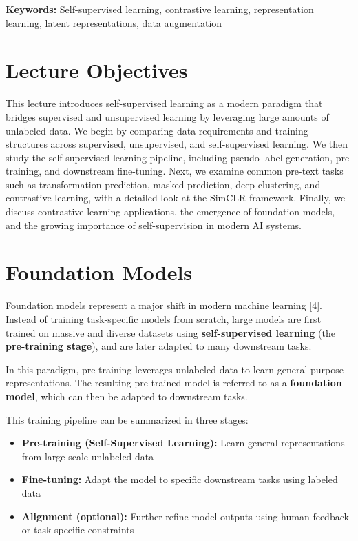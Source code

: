 \documentclass{article}
\renewcommand{\cite}[1]{[#1]}
\begin{document}
\noindent\textbf{Keywords:} Self-supervised learning, contrastive learning, representation learning, latent representations, data augmentation

\section{Lecture Objectives}

This lecture introduces self-supervised learning as a modern paradigm that bridges supervised and unsupervised learning by leveraging large amounts of unlabeled data. We begin by comparing data requirements and training structures across supervised, unsupervised, and self-supervised learning. We then study the self-supervised learning pipeline, including pseudo-label generation, pre-training, and downstream fine-tuning. Next, we examine common pre-text tasks such as transformation prediction, masked prediction, deep clustering, and contrastive learning, with a detailed look at the SimCLR framework. Finally, we discuss contrastive learning applications, the emergence of foundation models, and the growing importance of self-supervision in modern AI systems.

\section{Foundation Models}

Foundation models represent a major shift in modern machine learning \cite{4}. Instead of training task-specific models from scratch, large models are first trained on massive and diverse datasets using \textbf{self-supervised learning} (the \textbf{pre-training stage}), and are later adapted to many downstream tasks.

In this paradigm, pre-training leverages unlabeled data to learn general-purpose representations. The resulting pre-trained model is referred to as a \textbf{foundation model}, which can then be adapted to downstream tasks.

This training pipeline can be summarized in three stages:
\begin{itemize}
\item \textbf{Pre-training (Self-Supervised Learning):} Learn general representations from large-scale unlabeled data
\item \textbf{Fine-tuning:} Adapt the model to specific downstream tasks using labeled data
\item \textbf{Alignment (optional):} Further refine model outputs using human feedback or task-specific constraints
\end{itemize}
\end{document}
